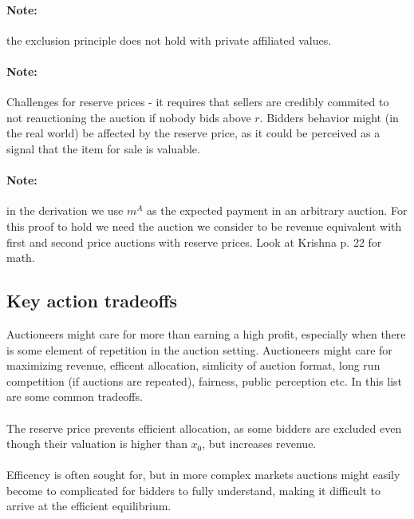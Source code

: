 \paragraph{Note:} the exclusion principle does not hold with private affiliated values.

\paragraph{Note:} Challenges for reserve prices - it requires that sellers are credibly commited to not reauctioning the auction if nobody bids above $r$. Bidders behavior might (in the real world) be affected by the reserve price, as it could be perceived as a signal that the item for sale is valuable.

\paragraph{Note:} in the derivation we use $m^A$ as the expected payment in an arbitrary auction. For this proof to hold we need the auction we consider to be revenue equivalent with first and second price auctions with reserve prices. Look at Krishna p. 22 for math.


\subsection{Key action tradeoffs}
Auctioneers might care for more than earning a high profit, especially when there is some element of repetition in the auction setting. Auctioneers might care for maximizing revenue, efficent allocation, simlicity of auction format, long run competition (if auctions are repeated), fairness, public perception etc. In this list are some common tradeoffs.
\\ \\
The reserve price prevents efficient allocation, as some bidders are excluded even though their valuation is higher than $x_0$, but increases revenue.
\\ \\
Efficency is often sought for, but in more complex markets auctions might easily become to complicated for bidders to fully understand, making it difficult to arrive at the efficient equilibrium. 
